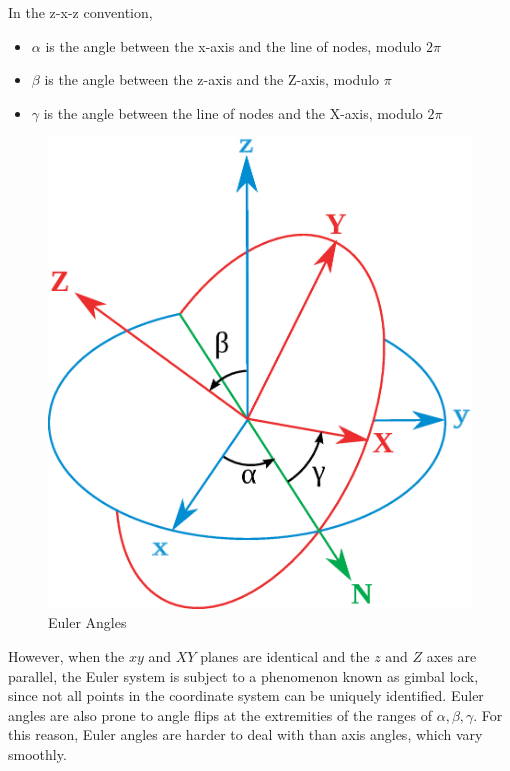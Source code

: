 \documentclass[12pt,a4,notitlepage]{report}
\renewcommand{\_}{\texttt{\symbol{95}}}
\newcommand{\<}{\texttt{\symbol{60}}}
\renewcommand{\>}{\texttt{\symbol{62}}}
\begin{document}
In the z-x-z convention,

\begin{itemize}
\item $\alpha$ is the angle between the x-axis and the line of nodes, modulo $2\pi$
\item $\beta$ is the angle between the z-axis and the Z-axis, modulo $\pi$
\item $\gamma$ is the angle between the line of nodes and the X-axis, modulo $2\pi$
\end{itemize}

\begin{figure}[hb]
\centering
\includegraphics[scale=0.2,angle=0]{diagrams/eulerangles.ps}
\caption{Euler Angles}
\label{eulerangles}
\end{figure}

However, when the $xy$ and $XY$ planes are identical and the $z$ and $Z$ axes are parallel, the Euler system is subject to a phenomenon known as gimbal lock, since not all points in the coordinate system can be uniquely identified. Euler angles are also prone to angle flips at the extremities of the ranges of $\alpha,\beta,\gamma$. For this reason, Euler angles are harder to deal with than axis angles, which vary smoothly.
\end{document}
